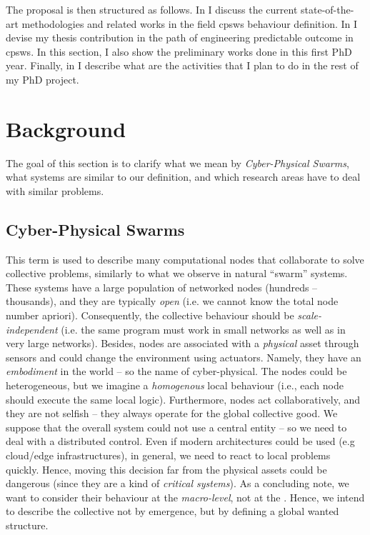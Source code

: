 \documentclass[11pt]{article}
\begin{document}
The proposal is then structured as follows. In  I discuss the current state-of-the-art methodologies and related works in the field \acp{cpsw} behaviour definition.
%
In  I devise my thesis contribution in the path of engineering predictable outcome in \acp{cpsw}. 
%
In this section, I also show the preliminary works done in this first PhD year.
%
Finally, in  I describe what are the activities that I plan to do in the rest of my PhD project.

\section{Background} \label{background}
The goal of this section is to clarify what we mean by \textit{Cyber-Physical Swarms}, what systems are similar to our definition, and which research areas have to deal with similar problems.
\subsection{Cyber-Physical Swarms}
This term is used to describe many computational nodes that collaborate to solve collective problems, similarly to what we observe in natural ``swarm'' systems.
%
These systems have a large population of networked nodes (hundreds -- thousands), and they are typically \textit{open} (i.e. we cannot know the total node number apriori). 
%
Consequently, the collective behaviour should be \textit{scale-independent} (i.e. the same program must work in small networks as well as in very large networks).
%
Besides, nodes are associated with a \textit{physical} asset through sensors and could change the environment using actuators. 
%
Namely, they have an \emph{embodiment} in the world -- so the name of cyber-physical. 
%
The nodes could be heterogeneous, but we imagine a \emph{homogenous} local behaviour (i.e., each node should execute the same local logic). 
%
Furthermore, nodes act collaboratively, and they are not selfish -- they always operate for the global collective good.
%
We suppose that the overall system could not use a central entity -- so we need to deal with a distributed control. 
%
Even if modern architectures could be used (e.g cloud/edge infrastructures), in general, we need to react to local problems quickly. 
%
Hence, moving this decision far from the physical assets could be dangerous (since they are a kind of \emph{critical systems}).
%
As a concluding note, we want to consider their behaviour at the \textit{macro-level}, not at the . 
%
Hence, we intend to describe the collective not by emergence, but by defining a global wanted structure.
\end{document}
